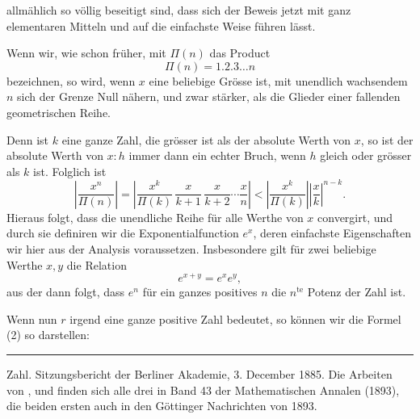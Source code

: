 
allm\"ahlich so v\"ollig beseitigt sind, dass sich der Beweis jetzt mit ganz elementaren Mitteln und auf die einfachste Weise f\"uhren l\"asst.

Wenn wir, wie schon fr\"uher, mit $\Pi(n)$ das Product
\[
\Pi(n) = 1.2.3\dots n
\]
bezeichnen, so wird, wenn $x$ eine beliebige Gr\"osse ist,
mit unendlich wachsendem $n$ sich der Grenze Null n\"ahern, und zwar st\"arker, als die Glieder einer fallenden geometrischen Reihe.

Denn ist $k$ eine ganze Zahl, die gr\"osser ist als der absolute Werth von $x$, so ist der absolute Werth von $x : h$ immer dann ein echter Bruch, wenn $h$ gleich oder gr\"osser als $k$ ist. Folglich ist
\[
\left|\frac{x^n}{\Pi(n)}\right| = \left|\frac{x^k}{\Pi(k)}\, \frac{x}{k+1}\, \frac{x}{k+2} \cdots \frac{x}{n}\right| < \left|\frac{x^k}{\Pi(k)}\right| \left|\frac{x}{k}\right|^{n-k}.
\]
Hieraus folgt, dass die unendliche Reihe
f\"ur alle Werthe von $x$ convergirt, und durch sie definiren wir die Exponentialfunction $e^x$, deren einfachste Eigenschaften wir hier aus der Analysis voraussetzen. Insbesondere gilt f\"ur zwei beliebige Werthe $x, y$ die Relation
\[
e^{x+y} = e^x e^y,
\]
aus der dann folgt, dass $e^n$ f\"ur ein ganzes positives $n$ die $n^{\text{te}}$ Potenz der Zahl
ist.

Wenn nun $r$ irgend eine ganze positive Zahl bedeutet, so k\"onnen wir die Formel (2) so darstellen:

\noindent\rule{4cm}{0.4pt}

Zahl\grqq{}. Sitzungsbericht der Berliner Akademie, 3. December 1885. Die Arbeiten von ,  und  finden sich alle drei in Band 43 der Mathematischen Annalen (1893), die beiden ersten auch in den G\"ottinger Nachrichten von 1893.
